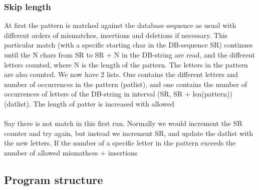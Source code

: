 \documentclass[12pt]{article}
\begin{document}
\subsubsection{Skip length}
At first the pattern is matched against the database sequence as usual with different orders of mismatches, insertions and
deletions if necessary. This particular match (with a specific starting char in the DB-sequence SR) continues until
the N chars from SR to SR + N in the DB-string are read, and the different letters counted, where N is the length of the
pattern. The letters in the pattern are also counted. We now have 2 lists. One contains the different letters and number
of occurrences in the pattern (patlist), and one contains the number of occurrences of letters of the DB-string in interval
(SR, SR + len(pattern)) (datlist). The length of patter is increased with allowed  \\ \\
Say there is not match in this first run. Normally we would increment the SR counter and try again, but instead we
increment SR, and update the datlist with the new letters. If the number of a specific letter in the pattern exceeds the
number of allowed mismathces + insertions
\subsection{Program structure}
\end{document}
